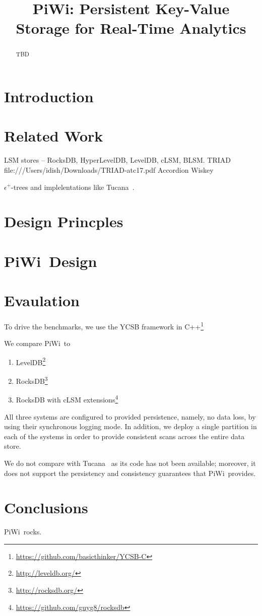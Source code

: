 \documentclass[10pt,preprint,numbers]{sigplanconf}
\date{}
\newcommand{\sys}{PiWi}
\begin{document}
\title{\sys: Persistent Key-Value Storage for Real-Time Analytics} 
\maketitle

\begin{abstract}

TBD

\end{abstract}

\section{Introduction}


\section{Related Work}
\label{sec:related}

LSM stores -- RocksDB, HyperLevelDB, LevelDB, cLSM, BLSM.
TRIAD file:///Users/idish/Downloads/TRIAD-atc17.pdf
Accordion
Wiskey

$\epsilon^+$-trees and implelentations like Tucana~\cite{tucana}.


\section{Design Princples}
\label{sec:principles}


\section{\sys\ Design}
\label{sec:design}



\section{Evaulation}
\label{sec:eval}

To drive the benchmarks, we use the 
YCSB framework in C++\footnote{\url{https://github.com/basicthinker/YCSB-C}}  

We compare \sys\ to 
\begin{enumerate}
\item
LevelDB\footnote{\url{http://leveldb.org/}}
\item
RocksDB\footnote{\url{http://rocksdb.org/}}
\item
RocksDB with cLSM extensions\footnote{\url{https://github.com/guyg8/rocksdb}}
\end{enumerate}
All three systems are configured to provided persistence, namely, no data loss, by using their synchronous logging mode.
In addition, we deploy a single partition in each of the systems in order to provide consistent scans across the entire data store.

We do not compare with Tucana~\cite{tucana} as its code has not been available; moreover, it does not support the persistency and consistency guarantees that \sys\ provides. 


\section{Conclusions}
\label{sec:conclusions}
\sys\ rocks.


 
\end{document}

